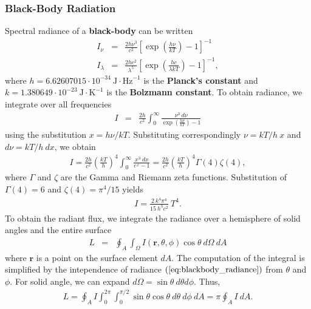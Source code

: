 \documentclass [12pt, a4paper] {article}
\newcommand{\vc}[1]
{
	\boldsymbol{#1}
}
\begin{document}
\subsubsection{Black-Body Radiation}
Spectral radiance of a \textbf{black-body} can be written 
\begin{eqnarray}
    \label{eq:blackbody_specfreq}
    I_\nu
    &=&
    \frac{2h\nu^3}{c^2}
    \left[
        \exp\left({\frac{h\nu}{kT}}\right) - 1
    \right]^{-1}
    \\
    \label{eq:blackbody_specwave}
    I_\lambda
    &=&
    \frac{2hc^2}{\lambda^5}
    \left[
        \exp\left({\frac{hc}{\lambda kT}}\right) - 1
    \right]^{-1},
\end{eqnarray} 
where 
$h=6.62607015\cdot 10^{-34}\:\textrm{J}\cdot\textrm{Hz}^{-1}$ is 
the \textbf{Planck's constant} and 
$k=1.380649\cdot{10}^{-23}\:\textrm{J}\cdot\textrm{K}^{-1}$ is the 
\textbf{Bolzmann constant}.
To obtain radiance, we integrate over all frequencies
\begin {eqnarray}
    I 
    &=&
    \frac{2h}{c^2}\int_0^\infty
    \frac{\nu^3\:d\nu}{\exp\left(\frac{h\nu}{kT}\right) - 1}
\end {eqnarray}
using the substitution $x=h\nu/kT$. Substituting correspondingly 
$\nu=kT/h\:x$ and $d\nu=kT/h\:dx$, we obtain 
\begin {eqnarray}
    I 
    =
    \frac{2h}{c^2}\left(\frac{kT}{h}\right)^4
    \int_0^\infty\frac{x^3\:dx}{e^x - 1}
    =
    \frac{2h}{c^2}\left(\frac{kT}{h}\right)^4 \Gamma(4)\zeta(4),
\end {eqnarray}
where $\Gamma$ and $\zeta$ are the Gamma and Riemann zeta functions.
Substitution of $\Gamma(4) = 6$ and $\zeta(4) = \pi^4/15$ yields 
\begin {eqnarray}
    \label{eq:blackbody_radiance}
    I
    =
    \frac{2\:k^4\pi^4}{15\:h^3c^2}\:T^4.
\end {eqnarray}
To obtain the radiant flux, we integrate the radiance over a hemisphere
of solid angles and the entire surface 
\begin {eqnarray}
    L 
    &=&
    \oint_A\int_\Omega I(\vc r, \theta, \phi)\cos\theta\:d\Omega\:dA
\end {eqnarray}
where $\vc r$ is a point on the surface element $dA$. The computation of the 
integral is simplified by the intependence of radiance 
$(\ref{eq:blackbody_radiance})$ from $\theta$ and $\phi$. For solid angle,
we can expand $d\Omega = \sin\theta\:d\theta d\phi$. Thus, 
\begin {eqnarray}
    L 
    = 
    \oint_A I 
    \int_0^{2\pi}\int_0^{\pi/2}\sin\theta\cos\theta\:d\theta\:d\phi\:dA
    =
    \pi\oint_A I\:dA.
\end {eqnarray}
\end{document}
